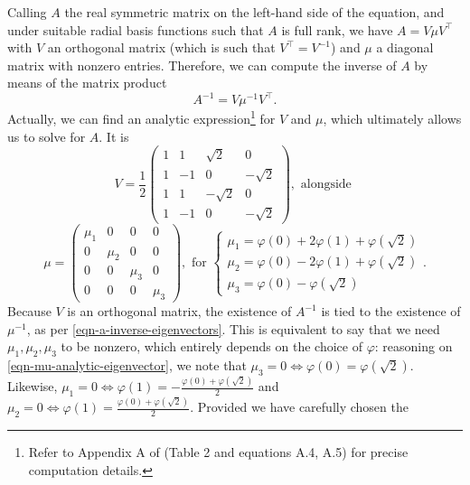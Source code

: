 \documentclass[12pt]{report} %
\begin{document}
Calling $A$ the real symmetric matrix on the left-hand side of the equation,
and under suitable radial basis functions such that $A$ is full rank, we have
$A = V \mu V^{\top}$ with $V$ an orthogonal matrix (which is such that $V^{\top} =
V^{- 1}$) and $\mu$ a diagonal matrix with nonzero entries. Therefore, we can
compute the inverse of $A$ by means of the matrix product
\begin{equation}
  A^{- 1} = V \mu^{- 1} V^{\top} . \label{eqn-a-inverse-eigenvectors}
\end{equation}
Actually, we can find an analytic expression\footnote{Refer to Appendix A of
{\cite{broomhead1988multivariable}} (Table 2 and equations A.4, A.5) for precise computation details.} for $V$
and $\mu$, which ultimately allows us to solve for $A$. It is
\[ V = \frac{1}{2} \left(\begin{array}{rrrr}
     1 & 1 & \sqrt{2} & 0\\
     1 & - 1 & 0 & - \sqrt{2}\\
     1 & 1 & - \sqrt{2} & 0\\
     1 & - 1 & 0 & - \sqrt{2}
   \end{array}\right), \text{ alongside } \]
\begin{equation}
  \mu = \left(\begin{array}{cccc}
    \mu_1 & 0 & 0 & 0\\
    0 & \mu_2 & 0 & 0\\
    0 & 0 & \mu_3 & 0\\
    0 & 0 & 0 & \mu_3
  \end{array}\right), \text{ for } \left\{\begin{array}{l}
    \mu_1 = \varphi (0) + 2 \varphi (1) + \varphi \left( \sqrt{2} \right)\\
    \mu_2 = \varphi (0) - 2 \varphi (1) + \varphi \left( \sqrt{2} \right)\\
    \mu_3 = \varphi (0) - \varphi \left( \sqrt{2} \right)
  \end{array}\right. . \label{eqn-mu-analytic-eigenvector}
\end{equation}
Because $V$ is an orthogonal matrix, the existence of $A^{- 1}$ is tied to the
existence of $\mu^{- 1}$, as per \eqref{eqn-a-inverse-eigenvectors}. This is
equivalent to say that we need $\mu_1, \mu_2, \mu_3$ to be nonzero, which
entirely depends on the choice of $\varphi$: reasoning on
\eqref{eqn-mu-analytic-eigenvector}, we note that $\mu_3 = 0 \Leftrightarrow
\varphi (0) = \varphi \left( \sqrt{2} \right)$. Likewise, $\mu_1 = 0
\Leftrightarrow \varphi (1) = - \frac{\varphi (0) + \varphi \left( \sqrt{2}
\right)}{2}$ and $\mu_2 = 0 \Leftrightarrow \varphi (1) = \frac{\varphi (0) +
\varphi \left( \sqrt{2} \right)}{2}$. Provided we have carefully chosen the
\end{document}
